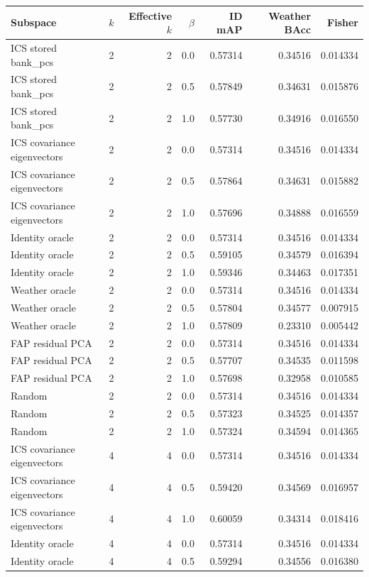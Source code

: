 \begin{tabular}{lrrrrrr}
\toprule
Subspace & $k$ & Effective $k$ & $\beta$ & ID mAP & Weather BAcc & Fisher \\
\midrule
ICS stored bank_pcs & 2 & 2 & 0.0 & 0.57314 & 0.34516 & 0.014334 \\
ICS stored bank_pcs & 2 & 2 & 0.5 & 0.57849 & 0.34631 & 0.015876 \\
ICS stored bank_pcs & 2 & 2 & 1.0 & 0.57730 & 0.34916 & 0.016550 \\
ICS covariance eigenvectors & 2 & 2 & 0.0 & 0.57314 & 0.34516 & 0.014334 \\
ICS covariance eigenvectors & 2 & 2 & 0.5 & 0.57864 & 0.34631 & 0.015882 \\
ICS covariance eigenvectors & 2 & 2 & 1.0 & 0.57696 & 0.34888 & 0.016559 \\
Identity oracle & 2 & 2 & 0.0 & 0.57314 & 0.34516 & 0.014334 \\
Identity oracle & 2 & 2 & 0.5 & 0.59105 & 0.34579 & 0.016394 \\
Identity oracle & 2 & 2 & 1.0 & 0.59346 & 0.34463 & 0.017351 \\
Weather oracle & 2 & 2 & 0.0 & 0.57314 & 0.34516 & 0.014334 \\
Weather oracle & 2 & 2 & 0.5 & 0.57804 & 0.34577 & 0.007915 \\
Weather oracle & 2 & 2 & 1.0 & 0.57809 & 0.23310 & 0.005442 \\
FAP residual PCA & 2 & 2 & 0.0 & 0.57314 & 0.34516 & 0.014334 \\
FAP residual PCA & 2 & 2 & 0.5 & 0.57707 & 0.34535 & 0.011598 \\
FAP residual PCA & 2 & 2 & 1.0 & 0.57698 & 0.32958 & 0.010585 \\
Random & 2 & 2 & 0.0 & 0.57314 & 0.34516 & 0.014334 \\
Random & 2 & 2 & 0.5 & 0.57323 & 0.34525 & 0.014357 \\
Random & 2 & 2 & 1.0 & 0.57324 & 0.34594 & 0.014365 \\
ICS covariance eigenvectors & 4 & 4 & 0.0 & 0.57314 & 0.34516 & 0.014334 \\
ICS covariance eigenvectors & 4 & 4 & 0.5 & 0.59420 & 0.34569 & 0.016957 \\
ICS covariance eigenvectors & 4 & 4 & 1.0 & 0.60059 & 0.34314 & 0.018416 \\
Identity oracle & 4 & 4 & 0.0 & 0.57314 & 0.34516 & 0.014334 \\
Identity oracle & 4 & 4 & 0.5 & 0.59294 & 0.34556 & 0.016380 \\

\end{tabular}
